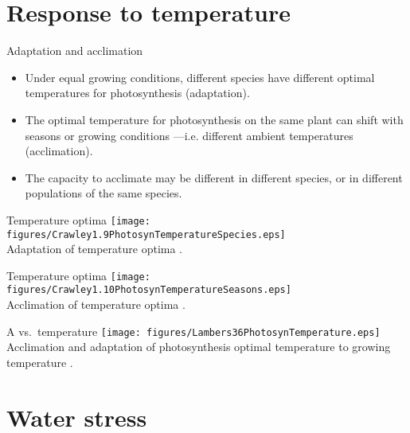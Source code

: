 \documentclass[10pt]{beamer}
\begin{document}
\section{Response to temperature}

\begin{frame}{Adaptation and acclimation}
    \begin{itemize}
        \item Under equal growing conditions, different species have
        different optimal temperatures for photosynthesis
        (adaptation).
        \item The optimal temperature for photosynthesis on the same
        plant can shift with seasons or growing conditions ---i.e. different ambient
        temperatures (acclimation).
        \item The capacity to acclimate may be different in
        different species, or in different populations of the same
        species.
    \end{itemize}
\end{frame}

\begin{frame}{Temperature optima}
    \centering
    \texttt{[image: figures/Crawley1.9PhotosynTemperatureSpecies.eps]}\\
    {\footnotesize Adaptation of temperature optima \autocite[from][]{Crawley1997}.}
\end{frame}

\begin{frame}{Temperature optima}
    \centering
   \texttt{[image: figures/Crawley1.10PhotosynTemperatureSeasons.eps]}\\
    {\footnotesize Acclimation of temperature optima \autocite[from][]{Crawley1997}.}
\end{frame}

\begin{frame}{A vs.\ temperature}
    \centering
    \texttt{[image: figures/Lambers36PhotosynTemperature.eps]}\\
    {\footnotesize Acclimation and adaptation of photosynthesis optimal
    temperature to growing temperature
    \autocite[from][]{LambersEtAl1998}.}
\end{frame}

\section{Water stress}
\end{document}
